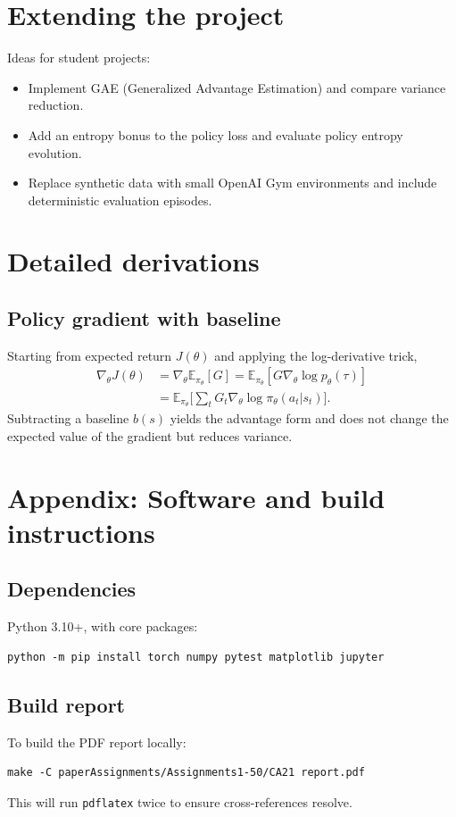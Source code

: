 \documentclass[11pt,a4paper]{article}
\begin{document}
\section{Extending the project}
Ideas for student projects:
\begin{itemize}
  \item Implement GAE (Generalized Advantage Estimation) and compare variance reduction.
  \item Add an entropy bonus to the policy loss and evaluate policy entropy evolution.
  \item Replace synthetic data with small OpenAI Gym environments and include deterministic evaluation episodes.
\end{itemize}

\section{Detailed derivations}
\subsection{Policy gradient with baseline}
Starting from expected return $J(\theta)$ and applying the log-derivative trick,
\begin{align}
\nabla_\theta J(\theta) &= \nabla_\theta \mathbb{E}_{\pi_\theta}[G] = \mathbb{E}_{\pi_\theta}[G \nabla_\theta \log p_\theta(\tau)] \\
&= \mathbb{E}_{\pi_\theta}\Big[ \sum_t G_t \nabla_\theta \log \pi_\theta(a_t|s_t) \Big].
\end{align}
Subtracting a baseline $b(s)$ yields the advantage form and does not change the expected value of the gradient but reduces variance.

\section{Appendix: Software and build instructions}
\subsection{Dependencies}
Python 3.10+, with core packages:
\begin{verbatim}
python -m pip install torch numpy pytest matplotlib jupyter
\end{verbatim}

\subsection{Build report}
To build the PDF report locally:
\begin{verbatim}
make -C paperAssignments/Assignments1-50/CA21 report.pdf
\end{verbatim}
This will run \texttt{pdflatex} twice to ensure cross-references resolve.
\end{document}
